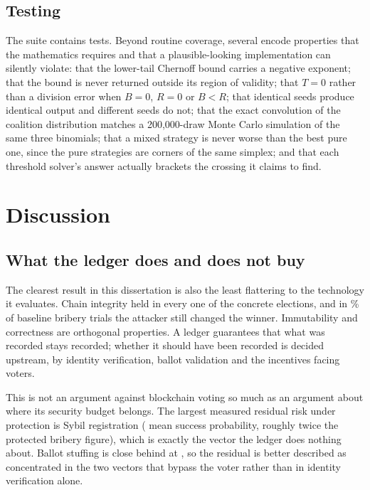 \documentclass[11pt,a4paper]{article}
\begin{document}
\subsection{Testing}

The suite contains \TestCount{} tests. Beyond routine coverage, several encode properties that the
mathematics requires and that a plausible-looking implementation can silently violate:
that the lower-tail Chernoff bound carries a negative exponent; that the bound is never
returned outside its region of validity; that $T = 0$ rather than a division error when
$B = 0$, $R = 0$ or $B < R$; that identical seeds produce identical output and different
seeds do not; that the exact convolution of the coalition distribution matches a
200{,}000-draw Monte Carlo simulation of the same three binomials; that a mixed strategy
is never worse than the best pure one, since the pure strategies are corners of the same
simplex; and that each threshold solver's answer actually brackets the crossing it
claims to find.









\section{Discussion}

\subsection{What the ledger does and does not buy}

The clearest result in this dissertation is also the least flattering to the technology
it evaluates. Chain integrity held in every one of the \ElectionTrials{} concrete
elections, and in \FlipBriberyBaseline\% of baseline bribery trials the attacker still
changed the winner. Immutability and correctness are orthogonal properties. A ledger
guarantees that what was recorded stays recorded; whether it should have been recorded
is decided upstream, by identity verification, ballot validation and the incentives
facing voters.

This is not an argument against blockchain voting so much as an argument about where
its security budget belongs. The largest measured residual risk under protection is Sybil
registration (\SybilProtected{} mean success probability, roughly twice the protected
bribery figure), which is exactly the vector the ledger does nothing about. Ballot
stuffing is close behind at \BallotStuffingProtected{}, so the residual is better
described as concentrated in the two vectors that bypass the voter rather than in
identity verification alone.
\end{document}
